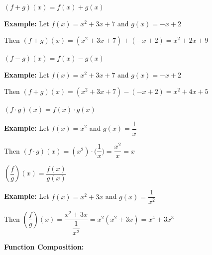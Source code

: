 \documentclass[12pt]{article}
\newenvironment{myindentpar}[1]%
     {\begin{list}{}%
             {\setlength{\leftmargin}{#1}}%
             \item[]%
     }
     {\end{list}}
\begin{document}
\begin{enumerate}
\item $(f+g)(x) = f(x) + g(x)$
\begin{myindentpar}{1cm}
\textbf{Example:} Let $f(x) = x^2+3x+7$ and $g(x) = -x+2$

Then $(f+g)(x) =  (x^2+3x+7) + (-x+2) = x^2+2x+9$

\end{myindentpar}
\item $(f-g)(x) = f(x) - g(x)$

\begin{myindentpar}{1cm}
\textbf{Example:} Let $f(x) = x^2+3x+7$ and $g(x) = -x+2$

Then $(f+g)(x) =  (x^2+3x+7) - (-x+2) = x^2+4x+5$

\end{myindentpar}

\item $(f \cdot g)(x) = f(x) \cdot g(x)$
\begin{myindentpar}{1cm}
\textbf{Example:} Let $f(x) = x^2$ and $g(x) = \dfrac{1}{x}$

Then $(f \cdot g)(x) =  (x^2) \cdot \Big(\dfrac{1}{x}\Big) = \dfrac{x^2}{x} = x$

\end{myindentpar}
\newpage
\item $(\dfrac{f}{g})(x) = \dfrac{f(x)}{g(x)}$

\begin{myindentpar}{1cm}
\textbf{Example:} Let $f(x) = x^2+3x$ and $g(x) = \dfrac{1}{x^2}$

Then $(\dfrac{f}{g})(x) =  \dfrac{x^2+3x}{\dfrac{1}{x^2}} = x^2(x^2+3x) = x^4+3x^3$

\end{myindentpar}
\end{enumerate}

\textbf{Function Composition:} 
\end{document}
